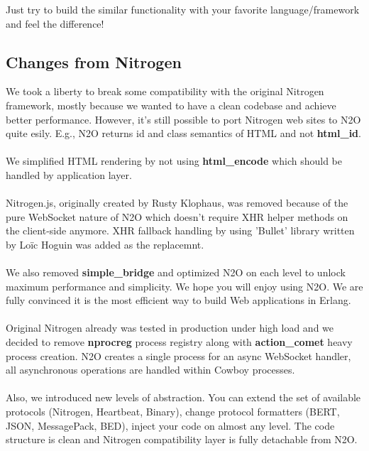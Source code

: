 Just try to build the similar functionality with your favorite language/framework and feel the difference!

\subsection*{Changes from Nitrogen}
We took a liberty to break some compatibility with the original
Nitrogen framework, mostly because we wanted to have a clean codebase
and achieve better performance. However, it's still possible to port
Nitrogen web sites to N2O quite esily. E.g., N2O returns id and class semantics
of HTML and not {\bf html\_id}.

\paragraph{}
We simplified HTML rendering by not using
{\bf html\_encode} which should be handled by application layer.

\paragraph{}
Nitrogen.js, originally created by Rusty Klophaus, was removed 
because of the pure WebSocket nature of N2O which doesn't
require XHR helper methods on the client-side anymore. XHR fallback
handling by using 'Bullet' library written by Loïc Hoguin was added as the replacemnt.

\paragraph{}
We also removed {\bf simple\_bridge} and optimized N2O on each level to
unlock maximum performance and simplicity. We hope you will enjoy
using N2O. We are fully convinced it is the most efficient way to
build Web applications in Erlang.

\paragraph{}
Original Nitrogen already was tested in production under high load and we
decided to remove {\bf nprocreg} process registry along 
with {\bf{action\_comet}} heavy process creation. N2O creates a single
process for an async WebSocket handler, all asynchronous operations
are handled within Cowboy processes.

\paragraph{}
Also, we introduced new levels of abstraction. You can extend
the set of available protocols (Nitrogen, Heartbeat, Binary), change protocol formatters (BERT,
JSON, MessagePack, BED), inject your code on almost any level. The code structure
is clean and Nitrogen compatibility layer is fully detachable from N2O.
